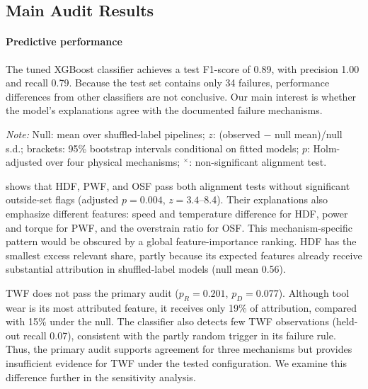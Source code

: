 \documentclass[conference]{IEEEtran}
\begin{document}
\subsection{Main Audit Results}
\label{sec:audit-results}

\paragraph{Predictive performance}
\label{sec:perf}

The tuned XGBoost classifier achieves a test F1-score of 0.89, with precision 1.00 and recall 0.79. Because the test set contains only 34 failures, performance differences from other classifiers are not conclusive. Our main interest is whether the model's explanations agree with the documented failure mechanisms.

\begin{table}[t]
\centering
\begin{threeparttable}
\caption{Audit using held-out SHAP values (path-dependent TreeSHAP, seed 42, $K=1{,}000$) with engineered inputs (primary) and with raw inputs only.}
\label{tab:audit}
\footnotesize
\setlength{\tabcolsep}{4pt}

\begin{tablenotes}[flushleft]
\footnotesize
\item \textit{Note:} Null: mean over shuffled-label pipelines; $z$: (observed $-$ null mean)/null s.d.; brackets: 95\% bootstrap intervals conditional on fitted models; $p$: Holm-adjusted over four physical mechanisms; $^{\times}$: non-significant alignment test.
\end{tablenotes}
\end{threeparttable}
\end{table}

 shows that HDF, PWF, and OSF pass both alignment tests without significant outside-set flags (adjusted $p=0.004$, $z=3.4$--8.4). Their explanations also emphasize different features: speed and temperature difference for HDF, power and torque for PWF, and the overstrain ratio for OSF. This mechanism-specific pattern would be obscured by a global feature-importance ranking. HDF has the smallest excess relevant share, partly because its expected features already receive substantial attribution in shuffled-label models (null mean 0.56).

TWF does not pass the primary audit ($p_R=0.201$, $p_D=0.077$). Although tool wear is its most attributed feature, it receives only 19\% of attribution, compared with 15\% under the null. The classifier also detects few TWF observations (held-out recall 0.07), consistent with the partly random trigger in its failure rule. Thus, the primary audit supports agreement for three mechanisms but provides insufficient evidence for TWF under the tested configuration. We examine this difference further in the sensitivity analysis.
\end{document}
